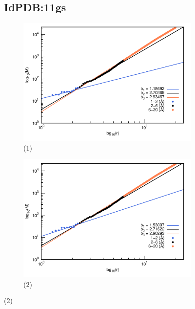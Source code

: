 		\begin{figure}[H]
			\subsection*{IdPDB:11gs}
			
			\hspace{-0.3cm} 
			\begin{subfigure}{0.49\textwidth}
				\centering
				\includegraphics[width=\linewidth,page=1]{graphs/PDBs/11gs/11gsaddH.pdf}
				\caption{(1)}
			\end{subfigure}
			\hspace{0.2cm}
			\begin{subfigure}{0.49\textwidth}
				\centering
				\includegraphics[width=\linewidth,page=1]{graphs/PDBs/11gs/11gsEm.pdf}
				\caption{(2)}
			\end{subfigure}
			

\end{figure}

